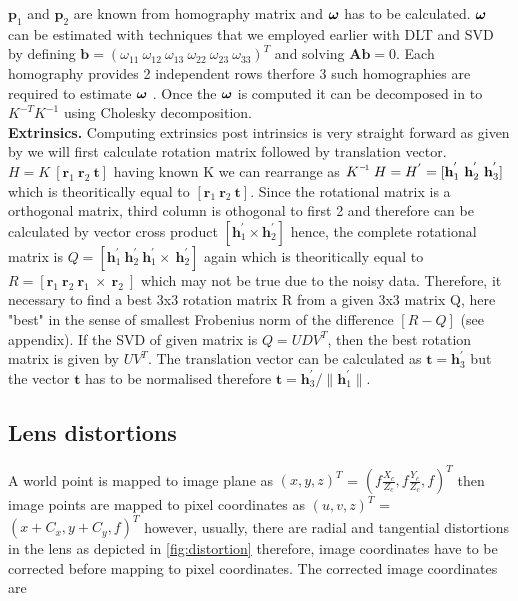 $\textbf{p}_1$ and $\textbf{p}_2$ are known from homography matrix and $\bm{\omega}$ has to be calculated. $\bm{\omega}$  can be estimated with techniques that we employed earlier with DLT and SVD by defining $ \textbf{b} = (\omega_{11}\ \omega_{12}\ \omega_{13}\  \omega_{22}\ \omega_{23}\ \omega_{33})^T $ and solving $ \textbf{A} \textbf{b} = 0.$ Each homography provides 2 independent rows therfore 3 such homographies are required to estimate $\bm{\omega}$ . Once the $\bm{\omega}$  is computed it can be decomposed in to $K^{-T} K^{-1}$ using Cholesky decomposition.\\

\textbf{Extrinsics.} Computing extrinsics post intrinsics is very straight forward as given by \cite{Zhang} we will first calculate rotation matrix followed by translation vector. $H = K\ [\textbf{r}_1\  \textbf{r}_2\  \textbf{t}] $ having known K we can rearrange as $\inv{K}\ H = H^{'} =  [\textbf{h}_1^{'}\  \textbf{h}_2^{'}\  \textbf{h}_3^{'}] $ which is theoritically equal to $[\textbf{r}_1\  \textbf{r}_2\  \textbf{t}] $. Since the rotational matrix is a orthogonal matrix, third column is othogonal to first 2 and therefore can be calculated by vector cross product $ [\textbf{h}_1^{'} \times \textbf{h}_2^{'} ] $ hence, the complete rotational matrix is  $ Q = [\textbf{h}_1^{'}\ \textbf{h}_2^{'}\ \textbf{h}_1^{'} \times\ \textbf{h}_2^{'} ] $ again which is theoritically equal to $ R = [\textbf{r}_1\ \textbf{r}_2\ \textbf{r}_1\ \times\ \textbf{r}_2\ ] $ which may not be true due to the noisy data. Therefore,  it necessary to find a best 3x3 rotation matrix  R from a given 3x3 matrix Q, here "best" in the sense of smallest Frobenius norm of the difference $[R-Q]$ (see appendix). If the SVD of given matrix is $ Q = UDV^T $, then the best rotation matrix is given by $UV^T$. The translation vector can be calculated as  $ \textbf{t} = \textbf{h}_3^{'}$ but the vector $\textbf{t} $ has to be normalised therefore $\textbf{t} = \textbf{h}_3^{'} / \|\textbf{h}_1^{'}\|$.

\subsection{Lens distortions} A world point is mapped to image plane as \( (x, y, z)^T \) = \( (\textit{f}\frac{X_c}{Z_c}, \textit{f}\frac{Y_c}{Z_c}, \textit{f} )^T\) then image points are mapped to pixel coordinates as \( (u, v, z)^T \) = \( ( x+C_x, y+C_y, \textit{f} )^T \) however, usually, there are radial and tangential distortions in the lens as depicted in \cref{fig:distortion} therefore, image coordinates have to be corrected before mapping to pixel coordinates. The corrected image coordinates are

